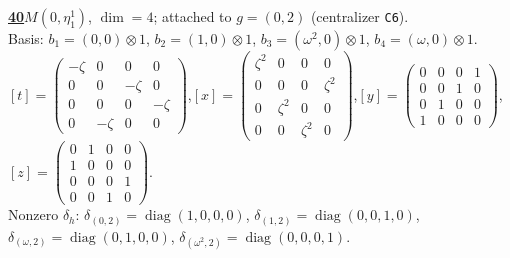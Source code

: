 \begin{samepage}\noindent\textbf{\underline{40}}\quad $M(0,\eta^{1}_{1})$, $\dim=4$; attached to $g=(0,2)$ (centralizer \texttt{C6}).\\
Basis: $b_{1}=(0,0)\otimes 1$, $b_{2}=(1,0)\otimes 1$, $b_{3}=(\omega^2,0)\otimes 1$, $b_{4}=(\omega,0)\otimes 1$.\\
$[t]=\left(\begin{smallmatrix} -\zeta & 0 & 0 & 0 \\ 0 & 0 & -\zeta & 0 \\ 0 & 0 & 0 & -\zeta \\ 0 & -\zeta & 0 & 0 \end{smallmatrix}\right)$,\quad $[x]=\left(\begin{smallmatrix} \zeta^2 & 0 & 0 & 0 \\ 0 & 0 & 0 & \zeta^2 \\ 0 & \zeta^2 & 0 & 0 \\ 0 & 0 & \zeta^2 & 0 \end{smallmatrix}\right)$,\quad $[y]=\left(\begin{smallmatrix} 0 & 0 & 0 & 1 \\ 0 & 0 & 1 & 0 \\ 0 & 1 & 0 & 0 \\ 1 & 0 & 0 & 0 \end{smallmatrix}\right)$,\quad $[z]=\left(\begin{smallmatrix} 0 & 1 & 0 & 0 \\ 1 & 0 & 0 & 0 \\ 0 & 0 & 0 & 1 \\ 0 & 0 & 1 & 0 \end{smallmatrix}\right)$.\\
Nonzero $\delta_h$: $\delta_{(0,2)}=\operatorname{diag}(1,0,0,0)$, $\delta_{(1,2)}=\operatorname{diag}(0,0,1,0)$, $\delta_{(\omega,2)}=\operatorname{diag}(0,1,0,0)$, $\delta_{(\omega^2,2)}=\operatorname{diag}(0,0,0,1)$.\end{samepage}
\medskip

